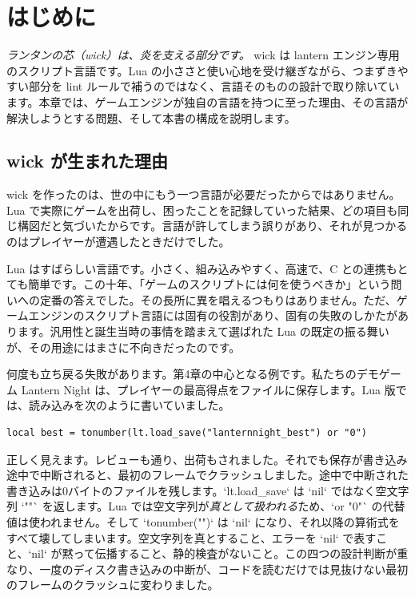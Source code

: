 \chapter{はじめに}

\emph{ランタンの芯（wick）は、炎を支える部分です。} wick は lantern エンジン専用のスクリプト言語です。Lua の小ささと使い心地を受け継ぎながら、つまずきやすい部分を lint ルールで補うのではなく、言語そのものの設計で取り除いています。本章では、ゲームエンジンが独自の言語を持つに至った理由、その言語が解決しようとする問題、そして本書の構成を説明します。

\section{wick が生まれた理由}

wick を作ったのは、世の中にもう一つ言語が必要だったからではありません。Lua で実際にゲームを出荷し、困ったことを記録していった結果、どの項目も同じ構図だと気づいたからです。言語が許してしまう誤りがあり、それが見つかるのはプレイヤーが遭遇したときだけでした。

Lua はすばらしい言語です。小さく、組み込みやすく、高速で、C との連携もとても簡単です。この十年、「ゲームのスクリプトには何を使うべきか」という問いへの定番の答えでした。その長所に異を唱えるつもりはありません。ただ、ゲームエンジンのスクリプト言語には固有の役割があり、固有の失敗のしかたがあります。汎用性と誕生当時の事情を踏まえて選ばれた Lua の既定の振る舞いが、その用途にはまさに不向きだったのです。

何度も立ち戻る失敗があります。第4章の中心となる例です。私たちのデモゲーム Lantern Night は、プレイヤーの最高得点をファイルに保存します。Lua 版では、読み込みを次のように書いていました。

\begin{lstlisting}[language=luatwin]
local best = tonumber(lt.load_save("lanternnight_best") or "0")
\end{lstlisting}

\noindent
正しく見えます。レビューも通り、出荷もされました。それでも保存が書き込み途中で中断されると、最初のフレームでクラッシュしました。途中で中断された書き込みは0バイトのファイルを残します。`lt.load_save` は `nil` ではなく空文字列 `""` を返します。Lua では空文字列が\emph{真として扱われる}ため、`or "0"` の代替値は使われません。そして `tonumber("")` は `nil` になり、それ以降の算術式をすべて壊してしまいます。空文字列を真とすること、エラーを `nil` で表すこと、`nil` が黙って伝播すること、静的検査がないこと。この四つの設計判断が重なり、一度のディスク書き込みの中断が、コードを読むだけでは見抜けない最初のフレームのクラッシュに変わりました。

